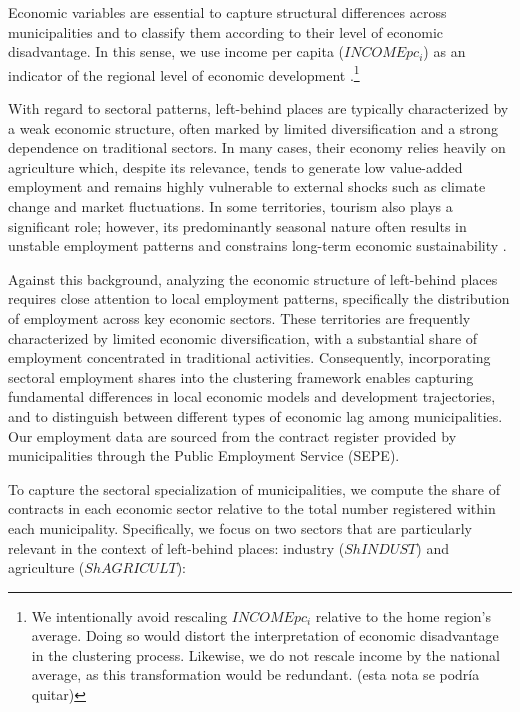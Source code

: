 \documentclass[a4paper,11pt,oneside]{article}
\begin{document}
Economic variables are essential to capture structural differences across municipalities and to classify them according to their level of economic disadvantage. In this sense, we use income per capita ($INCOMEpc_i$) as an indicator of the regional level of economic development \citep[see][]{velthuis2024regional,fiorentino2024left,Perancho2025}.\footnote{We intentionally avoid rescaling $INCOMEpc_i$ relative to the home region's average. Doing so would distort the interpretation of economic disadvantage in the clustering process. Likewise, we do not rescale income by the national average, as this transformation would be redundant. \color{red} (esta nota se podría quitar)}







With regard to sectoral patterns, left-behind places are typically characterized by a weak economic structure, often marked by limited diversification and a strong dependence on traditional sectors. In many cases, their economy relies heavily on agriculture which, despite its relevance, tends to generate low value-added employment and remains highly vulnerable to external shocks such as climate change and market fluctuations. In some territories, tourism also plays a significant role; however, its predominantly seasonal nature often results in unstable employment patterns and constrains long-term economic sustainability \citep{fiorentino2024left,jessen2024role}.

Against this background, analyzing the economic structure of left-behind places requires close attention to local employment patterns, specifically the distribution of employment across key economic sectors. These territories are frequently characterized by limited economic diversification, with a substantial share of employment concentrated in traditional activities. Consequently, incorporating sectoral employment shares into the clustering framework enables capturing fundamental differences in local economic models and development trajectories, and to distinguish between different types of economic lag among municipalities. Our employment data are sourced from the contract register provided by municipalities through the Public Employment Service (SEPE).


To capture the sectoral specialization of municipalities, we compute the share of contracts in each economic sector relative to the total number registered within each municipality. Specifically, we focus on two sectors that are particularly relevant in the context of left-behind places: industry ($ShINDUST$) and agriculture ($ShAGRICULT$):
\end{document}
